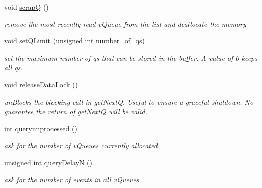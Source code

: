 \begin{DoxyCompactItemize}
void \hyperlink{classev_1_1queueAllocator_a1a914bc39f534dc50a7eb2ba846753bf}{scrapQ} ()
\begin{DoxyCompactList}\small\item\em remove the most recently read v\+Queue from the list and deallocate the memory \end{DoxyCompactList}\item 
\mbox{\label{classev_1_1queueAllocator_af6ca03ee35af1cf7dd5e2d8d8141e704}} 
void \hyperlink{classev_1_1queueAllocator_af6ca03ee35af1cf7dd5e2d8d8141e704}{set\+Q\+Limit} (unsigned int number\+\_\+of\+\_\+qs)
\begin{DoxyCompactList}\small\item\em set the maximum number of qs that can be stored in the buffer. A value of 0 keeps all qs. \end{DoxyCompactList}\item 
\mbox{\label{classev_1_1queueAllocator_aa3ab79f1da7f2930811ab980347b0305}} 
void \hyperlink{classev_1_1queueAllocator_aa3ab79f1da7f2930811ab980347b0305}{release\+Data\+Lock} ()
\begin{DoxyCompactList}\small\item\em un\+Blocks the blocking call in get\+NextQ. Useful to ensure a graceful shutdown. No guarantee the return of get\+NextQ will be valid. \end{DoxyCompactList}\item 
\mbox{\label{classev_1_1queueAllocator_adb785d0d33ba16522f8846da35c7ebab}} 
int \hyperlink{classev_1_1queueAllocator_adb785d0d33ba16522f8846da35c7ebab}{queryunprocessed} ()
\begin{DoxyCompactList}\small\item\em ask for the number of v\+Queues currently allocated. \end{DoxyCompactList}\item 
\mbox{\label{classev_1_1queueAllocator_a557861a4f3730b4d8da7895173c6986a}} 
unsigned int \hyperlink{classev_1_1queueAllocator_a557861a4f3730b4d8da7895173c6986a}{query\+DelayN} ()
\begin{DoxyCompactList}\small\item\em ask for the number of events in all v\+Queues. \end{DoxyCompactList}\item 

\end{DoxyCompactItemize}
